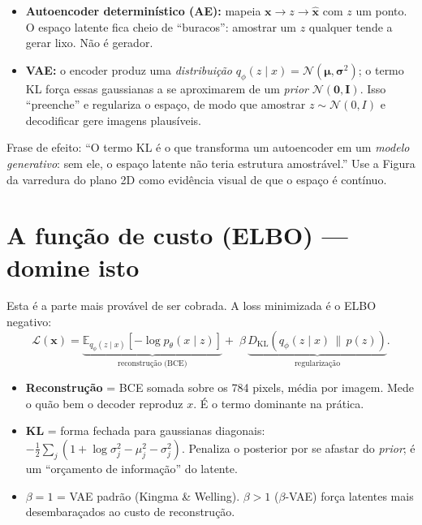 \documentclass[11pt,a4paper]{article}
\begin{document}
\begin{itemize}[leftmargin=1.2em, itemsep=0.1em]
\item \textbf{Autoencoder determinístico (AE):} mapeia $\mathbf{x}\to z\to
\hat{\mathbf{x}}$ com $z$ um ponto. O espaço latente fica cheio de ``buracos'':
amostrar um $z$ qualquer tende a gerar lixo. Não é gerador.
\item \textbf{VAE:} o encoder produz uma \emph{distribuição}
$q_\phi(z\mid x)=\mathcal{N}(\boldsymbol{\mu},\boldsymbol{\sigma}^2)$; o termo KL
força essas gaussianas a se aproximarem de um \textit{prior}
$\mathcal{N}(\mathbf{0},\mathbf{I})$. Isso ``preenche'' e regulariza o espaço, de
modo que amostrar $z\sim\mathcal{N}(0,I)$ e decodificar gere imagens plausíveis.
\end{itemize}

\begin{dica}
Frase de efeito: ``O termo KL é o que transforma um autoencoder em um
\emph{modelo generativo}: sem ele, o espaço latente não teria estrutura
amostrável.'' Use a Figura da varredura do plano 2D como evidência visual de que
o espaço é contínuo.
\end{dica}

\section{A função de custo (ELBO) --- domine isto}

Esta é a parte mais provável de ser cobrada. A loss minimizada é o ELBO
negativo:
\[
\mathcal{L}(\mathbf{x}) =
\underbrace{\mathbb{E}_{q_\phi(z\mid x)}[-\log p_\theta(x\mid z)]}
_{\text{reconstrução (BCE)}}
+\;\beta\,
\underbrace{D_{\mathrm{KL}}(q_\phi(z\mid x)\,\|\,p(z))}_{\text{regularização}} .
\]

\begin{itemize}[leftmargin=1.2em, itemsep=0.15em]
\item \textbf{Reconstrução} = BCE somada sobre os 784 pixels, média por imagem.
Mede o quão bem o decoder reproduz $x$. É o termo dominante na prática.
\item \textbf{KL} = forma fechada para gaussianas diagonais:
$-\tfrac12\sum_j(1+\log\sigma_j^2-\mu_j^2-\sigma_j^2)$. Penaliza o posterior por
se afastar do \textit{prior}; é um ``orçamento de informação'' do latente.
\item \textbf{$\beta=1$} = VAE padrão (Kingma \& Welling). $\beta>1$
($\beta$-VAE) força latentes mais desembaraçados ao custo de reconstrução.
\end{itemize}
\end{document}

